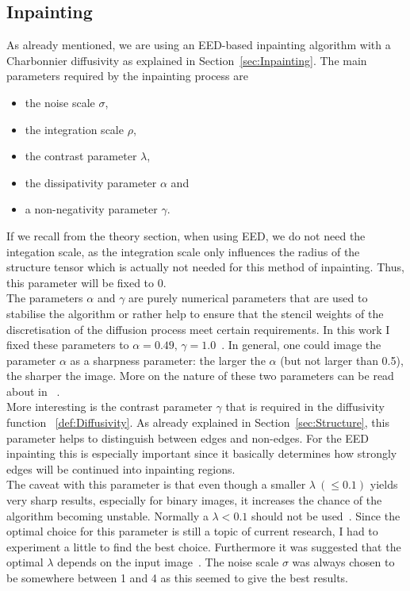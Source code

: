 \subsection{Inpainting}\label{sec:InpaintingEx}
As already mentioned, we are using an EED-based inpainting algorithm with a Charbonnier diffusivity
as explained in Section~\ref{sec:Inpainting}.
The main parameters required by the inpainting process are 
\begin{itemize}
    \item the noise scale $\sigma$,
    \item the integration scale $\rho$,
    \item the contrast parameter $\lambda$, 
    \item the dissipativity parameter $\alpha$ and
    \item a non-negativity parameter $\gamma$.
\end{itemize}
If we recall from the theory section, when using EED, we do not need the integation scale, as the
integration scale only influences the radius of the structure tensor which is actually not needed
for this method of inpainting. Thus, this parameter will be fixed to 0.\\
The parameters $\alpha$ and $\gamma$ are purely numerical parameters that are used to 
stabilise the algorithm or rather help to ensure that the stencil weights of the discretisation of
the diffusion process meet certain requirements.
In this work I fixed these parameters to $\alpha=0.49,\, \gamma=1.0$~\cite{conversation}. In general, one could image the parameter $\alpha$ as a sharpness parameter: the larger the
$\alpha$ (but not larger than 0.5), the sharper the image. More on the nature of these two parameters can be read about in
~\cite{www13, weickert96}.\\
More interesting is the contrast parameter $\gamma$ that is required in the diffusivity function
~\eqref{def:Diffusivity}. As already explained in Section~\ref{sec:Structure}, this parameter helps to
distinguish between edges and non-edges. For the EED inpainting this is especially important since
it basically determines how strongly edges will be continued into inpainting regions. \\
The caveat with this parameter is that even though a smaller $\lambda\ (\leq0.1)$ yields very sharp
results, especially for binary images, it increases the chance of the algorithm becoming unstable.
Normally a $\lambda<0.1$ should not be used~\cite{conversation}. Since the optimal choice for this parameter is still a
topic of current research, I had to experiment a little to find the best choice. Furthermore it was
suggested that the optimal $\lambda$ depends on the input image~\cite{schmaltz14}. 
The noise scale $\sigma$ was always chosen to be somewhere between 1 and 4 as this seemed to give
the best results.
